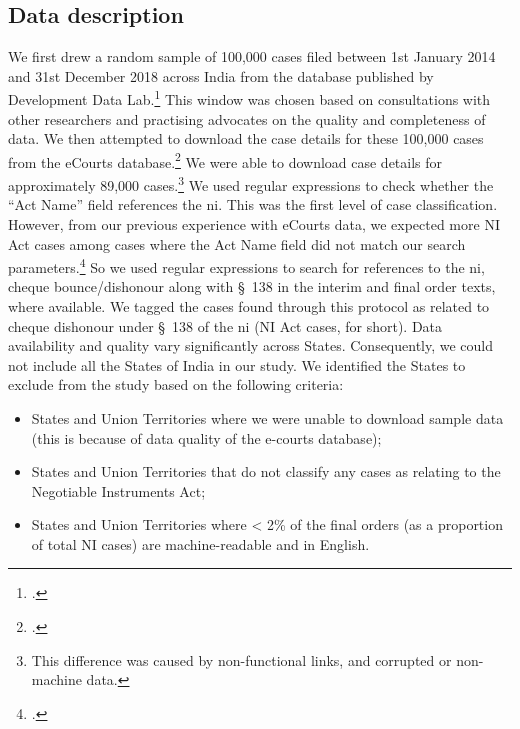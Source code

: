 \subsection{Data description} \label{sec:data-description}

We first drew a random sample of 100,000 cases filed between 1st January 2014 and 31st December 2018 across India from the database published by Development Data Lab.\footcite{devdatalabs2021_eCourtsData} This window was chosen based on consultations with other researchers and practising advocates on the quality and completeness of data. We then attempted to download the case details for these 100,000 cases from the eCourts database.\footcite{ecourts2022} We were able to download case details for approximately 89,000 cases.\footnote{This difference was caused by non-functional links, and corrupted or non-machine data.} We used regular expressions to check whether the ``Act Name'' field references the \gls{ni}. This was the first level of case classification. However, from our previous experience with eCourts data, we expected more NI Act cases among cases where the Act Name field did not match our search parameters.\footcite[The Act Name field sometimes does not contain the name of the substantive act, but rather the name of the procedural Act (e.g., CrPC) or, in rare cases, the subject matter of the case. This is mainly because case classification and nomenclature practices vary from state-to-state. However, in rare cases, the field is not populated or contains erroneous information. For details, please see,][]{damle2020_ecourtsData} So we used regular expressions to search for references to the \gls{ni}, cheque bounce/dishonour along with \S~138 in the interim and final order texts, where available. We tagged the cases found through this protocol as related to cheque dishonour under \S~138 of the \gls{ni} (NI Act cases, for short). Data availability and quality vary significantly across States. Consequently, we could not include all the States of India in our study. We identified the States to exclude from the study based on the following criteria:

\begin{itemize}
\item States and Union Territories where we were unable to download sample data (this is because of data quality of the e-courts database);
\item States and Union Territories that do not classify any cases as relating to the Negotiable Instruments Act;
\item States and Union Territories where < 2\% of the final orders (as a proportion of total NI cases) are machine-readable and in English.
\end{itemize}

